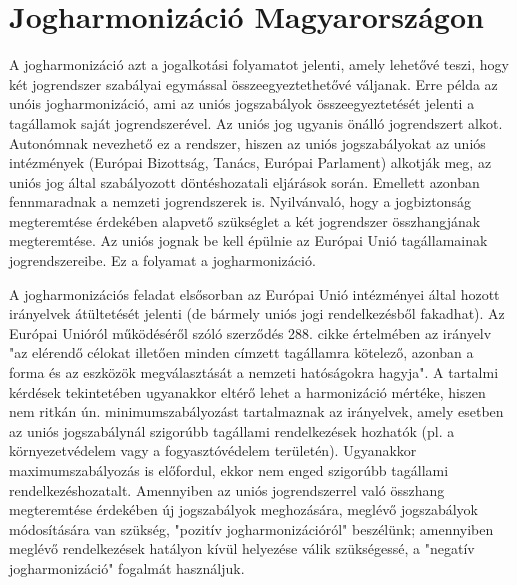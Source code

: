 \section{Jogharmonizáció Magyarországon} \label{jogharmonizacio}

A jogharmonizáció azt a jogalkotási folyamatot jelenti, amely lehetővé teszi, hogy két jogrendszer szabályai egymással összeegyeztethetővé váljanak. Erre példa az unóis jogharmonizáció, ami az uniós jogszabályok összeegyeztetését jelenti a tagállamok saját jogrendszerével. Az uniós jog ugyanis önálló jogrendszert alkot. Autonómnak nevezhető ez a rendszer, hiszen az uniós jogszabályokat az uniós intézmények (Európai Bizottság, Tanács, Európai Parlament) alkotják meg, az uniós jog által szabályozott döntéshozatali eljárások során. Emellett azonban fennmaradnak a nemzeti jogrendszerek is. Nyilvánvaló, hogy a jogbiztonság megteremtése érdekében alapvető szükséglet a két jogrendszer összhangjának megteremtése. Az uniós jognak be kell épülnie az Európai Unió tagállamainak jogrendszereibe. Ez a folyamat a jogharmonizáció.

A jogharmonizációs feladat elsősorban az Európai Unió intézményei által hozott irányelvek átültetését jelenti (de bármely uniós jogi rendelkezésből fakadhat). Az Európai Unióról működéséről szóló szerződés 288. cikke értelmében az irányelv "az elérendő célokat illetően minden címzett tagállamra kötelező, azonban a forma és az eszközök megválasztását a nemzeti hatóságokra hagyja". A tartalmi kérdések tekintetében ugyanakkor eltérő lehet a harmonizáció mértéke, hiszen nem ritkán ún. minimumszabályozást tartalmaznak az irányelvek, amely esetben az uniós jogszabálynál szigorúbb tagállami rendelkezések hozhatók (pl. a környezetvédelem vagy a fogyasztóvédelem területén). Ugyanakkor maximumszabályozás is előfordul, ekkor nem enged szigorúbb tagállami rendelkezéshozatalt. Amennyiben az uniós jogrendszerrel való összhang megteremtése érdekében új jogszabályok meghozására, meglévő jogszabályok módosítására van szükség, "pozitív jogharmonizációról" beszélünk; amennyiben meglévő rendelkezések hatályon kívül helyezése válik szükségessé, a "negatív jogharmonizáció" fogalmát használjuk.

